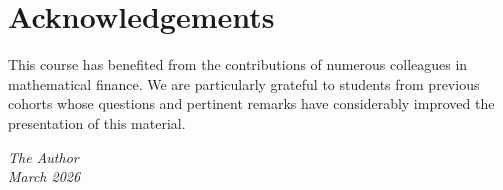 \section*{Acknowledgements}

This course has benefited from the contributions of numerous colleagues
in mathematical finance. We are particularly grateful to students from
previous cohorts whose questions and pertinent remarks have considerably
improved the presentation of this material.

\bigskip
\begin{flushright}
    \textit{The Author}\\
    \textit{March 2026}
\end{flushright}

\newpage
